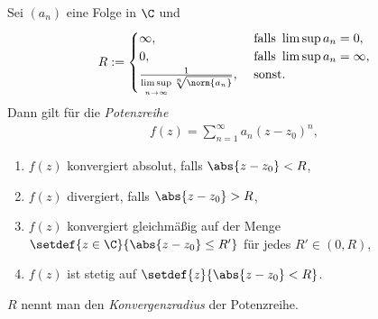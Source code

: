 \begin{prop}
\label{prop:1.27}
Sei $(a_n)$ eine Folge in $\C$ und
\begin{align*}
R := \begin{cases}
     \infty, & \text{ falls } \limsup a_n = 0,\\
     0, & \text{ falls } \limsup a_n = \infty,\\
     \frac{1}{\limsup\limits_{n\to\infty}
\sqrt[n]{\norm{a_n}}}, & \text{ sonst}.
     \end{cases}
\end{align*}
Dann gilt für die \emph{Potenzreihe}
\begin{align*}
f(z) = \sum\limits_{n=1}^\infty a_n (z-z_0)^n,
\end{align*}
\begin{enumerate}[label=(\roman{*})]
  \item\label{prop:1.16:1} $f(z)$ konvergiert absolut, falls $\abs{z-z_0} < R$,
  \item\label{prop:1.16:2} $f(z)$ divergiert, falls $\abs{z-z_0} > R$,
  \item\label{prop:1.16:3} $f(z)$ konvergiert gleichmäßig auf der Menge
  $\setdef{z\in\C}{\abs{z-z_0} \le R'}$ für jedes $R'\in (0,R)$,
  \item\label{prop:1.16:4} $f(z)$ ist stetig auf $\setdef{z}{\abs{z-z_0} < R}$.
\end{enumerate}
$R$ nennt man den \emph{Konvergenzradius} der Potenzreihe.\fishhere
\end{prop}
